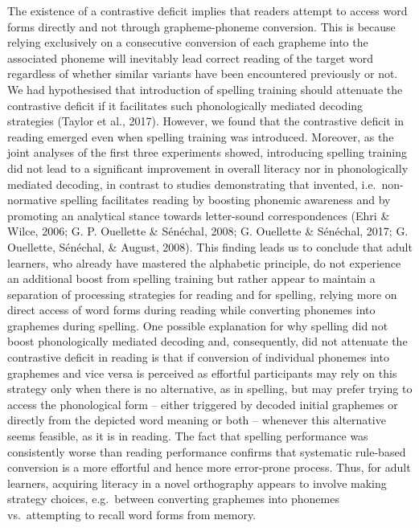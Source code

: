 \documentclass[doc,floatsintext]{apa6}
\begin{document}
The existence of a contrastive deficit implies that readers attempt to
access word forms directly and not through grapheme-phoneme conversion.
This is because relying exclusively on a consecutive conversion of each
grapheme into the associated phoneme will inevitably lead correct
reading of the target word regardless of whether similar variants have
been encountered previously or not. We had hypothesised that
introduction of spelling training should attenuate the contrastive
deficit if it facilitates such phonologically mediated decoding
strategies (Taylor et al., 2017). However, we found that the contrastive
deficit in reading emerged even when spelling training was introduced.
Moreover, as the joint analyses of the first three experiments showed,
introducing spelling training did not lead to a significant improvement
in overall literacy nor in phonologically mediated decoding, in contrast
to studies demonstrating that invented, i.e.~non-normative spelling
facilitates reading by boosting phonemic awareness and by promoting an
analytical stance towards letter-sound correspondences (Ehri \& Wilce,
2006; G. P. Ouellette \& Sénéchal, 2008; G. Ouellette \& Sénéchal, 2017;
G. Ouellette, Sénéchal, \& August, 2008). This finding leads us to
conclude that adult learners, who already have mastered the alphabetic
principle, do not experience an additional boost from spelling training
but rather appear to maintain a separation of processing strategies for
reading and for spelling, relying more on direct access of word forms
during reading while converting phonemes into graphemes during spelling.
One possible explanation for why spelling did not boost phonologically
mediated decoding and, consequently, did not attenuate the contrastive
deficit in reading is that if conversion of individual phonemes into
graphemes and vice versa is perceived as effortful participants may rely
on this strategy only when there is no alternative, as in spelling, but
may prefer trying to access the phonological form -- either triggered by
decoded initial graphemes or directly from the depicted word meaning or
both -- whenever this alternative seems feasible, as it is in reading.
The fact that spelling performance was consistently worse than reading
performance confirms that systematic rule-based conversion is a more
effortful and hence more error-prone process. Thus, for adult learners,
acquiring literacy in a novel orthography appears to involve making
strategy choices, e.g.~between converting graphemes into phonemes
vs.~attempting to recall word forms from memory.
\end{document}
